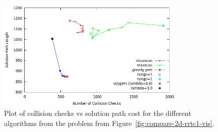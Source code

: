\documentclass{report}
\begin{document}
\begin{figure}
\centering
\includegraphics[width=0.8\textwidth]{figs/compare-2d-rrtc1-medians.png}
\caption{Plot of collision checks vs solution path cost for the
   different algorithms from the problem from
   Figure~\ref{fig:compare-2d-rrtc1-vis}.}
\end{figure}
\end{document}
